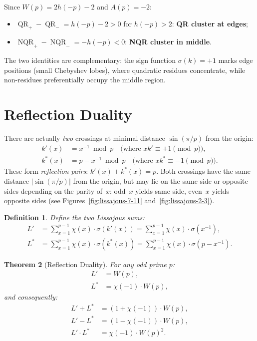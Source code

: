 \documentclass[11pt,a4paper]{article}
\newtheorem{theorem}{Theorem}
\newtheorem{definition}[theorem]{Definition}
\begin{document}
Since $W(p) = 2h(-p) - 2$ and $A(p) = -2$:
\begin{itemize}
\item $\operatorname{QR}_+ - \operatorname{QR}_- = h(-p) - 2 > 0$ for $h(-p) > 2$: \textbf{QR cluster at edges};
\item $\operatorname{NQR}_+ - \operatorname{NQR}_- = -h(-p) < 0$: \textbf{NQR cluster in middle}.
\end{itemize}

The two identities are complementary: the sign function $\sigma(k) = +1$ marks edge positions (small Chebyshev lobes), where quadratic residues concentrate, while non-residues preferentially occupy the middle region.

\section{Reflection Duality}

There are actually \emph{two} crossings at minimal distance $\sin(\pi/p)$ from the origin:
\begin{align*}
k'(x) &= x^{-1} \bmod p \quad \text{(where } xk' \equiv +1 \pmod p\text{)}, \\
k^*(x) &= p - x^{-1} \bmod p \quad \text{(where } xk^* \equiv -1 \pmod p\text{)}.
\end{align*}
These form \emph{reflection pairs}: $k'(x) + k^*(x) = p$. Both crossings have the same distance $|\sin(\pi/p)|$ from the origin, but may lie on the same side or opposite sides depending on the parity of~$x$: odd~$x$ yields same side, even~$x$ yields opposite sides (see Figures~\ref{fig:lissajous-7-11} and~\ref{fig:lissajous-2-3}).

\begin{definition}
Define the two Lissajous sums:
\begin{align*}
L' &= \sum_{x=1}^{p-1} \chi(x) \cdot \sigma(k'(x)) = \sum_{x=1}^{p-1} \chi(x) \cdot \sigma(x^{-1}), \\
L^* &= \sum_{x=1}^{p-1} \chi(x) \cdot \sigma(k^*(x)) = \sum_{x=1}^{p-1} \chi(x) \cdot \sigma(p - x^{-1}).
\end{align*}
\end{definition}

\begin{theorem}[Reflection Duality]\label{thm:duality}
For any odd prime $p$:
\begin{align}
L' &= W(p), \label{eq:Lprime}\\
L^* &= \chi(-1) \cdot W(p), \label{eq:Lstar}
\end{align}
and consequently:
\begin{align}
L' + L^* &= (1 + \chi(-1)) \cdot W(p), \label{eq:sum}\\
L' - L^* &= (1 - \chi(-1)) \cdot W(p), \label{eq:diff}\\
L' \cdot L^* &= \chi(-1) \cdot W(p)^2. \label{eq:prod}
\end{align}
\end{theorem}
\end{document}
